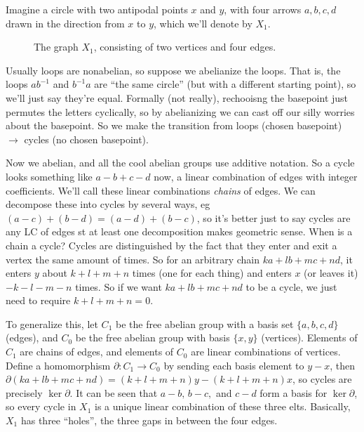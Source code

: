 Imagine a circle with two antipodal points $x$ and $y$, with four arrows $a,b,c,d$ drawn in the direction from $x$ to $y$, which we'll denote by $X_1$.
\begin{figure}[H]
    \centering
    \caption{The graph $X_1$, consisting of two vertices and four edges.}
    \label{x1}
\end{figure}
Usually loops are nonabelian, so suppose we abelianize the loops. That is, the loops $ab^{-1}$ and $b^{-1}a$ are ``the same circle'' (but with a different starting point), so we'll just say they're equal. Formally (not really), rechooisng the basepoint just permutes the letters cyclically, so by abelianizing we can cast off our silly worries about the basepoint. So we make the transition from loops (chosen basepoint) $\longrightarrow$ cycles (no chosen basepoint).

Now we abelian, and all the cool abelian groups use additive notation. So a cycle looks something like $a-b+c-d$ now, a linear combination of edges with integer coefficients. We'll call these linear combinations \emph{chains} of edges. We can decompose these into cycles by several ways, eg $(a-c)+(b-d)=(a-d)+(b-c)$, so it's better just to say cycles are any LC of edges st at least one decomposition makes geometric sense. When is a chain a cycle? Cycles are distinguished by the fact that they enter and exit a vertex the same amount of times. So for an arbitrary chain $ka+lb+mc+nd$, it enters $y$ about $k+l+m+n$ times (one for each thing) and enters $x$ (or leaves it) $-k-l-m-n$ times. So if we want $ka+lb+mc+nd$ to be a cycle, we just need to require $k+l+m+n=0$.

To generalize this, let $C_1$ be the free abelian group with a basis set $\{a,b,c,d\} $ (edges), and $C_0$ be the free abelian group with basis $\{x,y\} $ (vertices). Elements of $C_1$ are chains of edges, and elements of  $C_0$ are linear combinations of vertices. Define a homomorphism $\partial \colon C_1 \to C_0$ by sending each basis element to $y-x$, then $\partial (ka+lb+mc+nd)=(k+l+m+n)y-(k+l+m+n)x$, so cycles are precisely $\operatorname{ker}\partial $. It can be seen that $a-b,\,b-c,$ and $c-d$ form a basis for $\operatorname{ker}\partial $, so every cycle in $X_1$ is a unique linear combination of these three elts. Basically, $X_1$ has three ``holes'', the three gaps in between the four edges.

